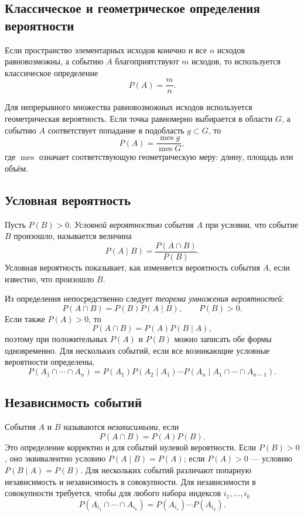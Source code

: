 \subsection{Классическое и геометрическое определения вероятности}

Если пространство элементарных исходов конечно и все $n$ исходов равновозможны,
а событию $A$ благоприятствуют $m$ исходов, то используется классическое определение
\[
    P(A)=\frac{m}{n}.
\]

Для непрерывного множества равновозможных исходов используется геометрическая
вероятность. Если точка равномерно выбирается в области $G$, а событию $A$
соответствует попадание в подобласть $g\subset G$, то
\[
    P(A)=\frac{\operatorname{mes} g}{\operatorname{mes} G},
\]
где $\operatorname{mes}$ означает соответствующую геометрическую меру: длину,
площадь или объём.

\subsection{Условная вероятность}

Пусть $P(B)>0$. \emph{Условной вероятностью} события $A$ при условии, что событие
$B$ произошло, называется величина
\[
    P(A\mid B)=\frac{P(A\cap B)}{P(B)}.
\]
Условная вероятность показывает, как изменяется вероятность события $A$, если
известно, что произошло $B$.

Из определения непосредственно следует \emph{теорема умножения вероятностей}:
\[
    P(A\cap B)=P(B)P(A\mid B),\qquad P(B)>0.
\]
Если также $P(A)>0$, то
\[
    P(A\cap B)=P(A)P(B\mid A),
\]
поэтому при положительных $P(A)$ и $P(B)$ можно записать обе формы одновременно.
Для нескольких событий, если все возникающие условные вероятности определены,
\[
    P(A_1\cap\cdots\cap A_n)
    =P(A_1)P(A_2\mid A_1)\cdots
    P(A_n\mid A_1\cap\cdots\cap A_{n-1}).
\]

\subsection{Независимость событий}

События $A$ и $B$ называются \emph{независимыми}, если
\[
    \boxed{P(A\cap B)=P(A)P(B).}
\]
Это определение корректно и для событий нулевой вероятности. Если $P(B)>0$, оно
эквивалентно условию $P(A\mid B)=P(A)$; если $P(A)>0$ --- условию
$P(B\mid A)=P(B)$.
Для нескольких событий различают попарную независимость и независимость в
совокупности. Для независимости в совокупности требуется, чтобы для любого набора
индексов $i_1,\ldots,i_k$
\[
    P(A_{i_1}\cap\cdots\cap A_{i_k})
    =P(A_{i_1})\cdots P(A_{i_k}).
\]

